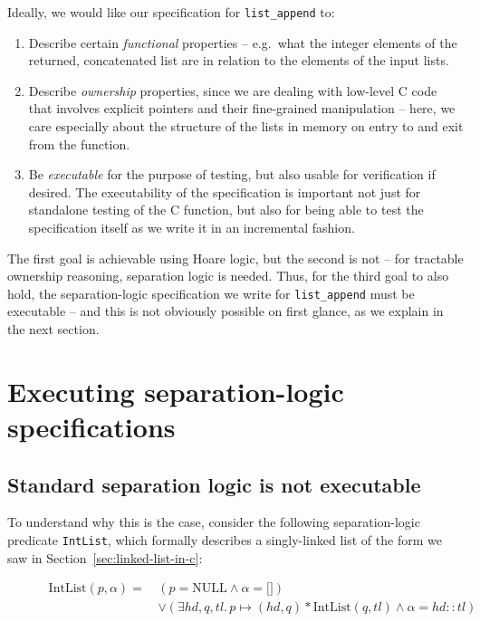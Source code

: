 Ideally, we would like our specification for \texttt{list\_append} to:

\begin{enumerate}
  \item Describe certain \emph{functional} properties -- e.g.~what the integer elements of the returned, concatenated list are in relation to the elements of the input lists.
  \item Describe \emph{ownership} properties, since we are dealing with low-level C code that involves explicit pointers and their fine-grained manipulation -- here, we care especially about the structure of the lists in memory on entry to and exit from the function.
  \item Be \emph{executable} for the purpose of testing, but also usable for verification if desired. The executability of the specification is important not just for standalone testing of the C function, but also for being able to test the specification itself as we write it in an incremental fashion.
\end{enumerate}

The first goal is achievable using Hoare logic, but the second is not -- for tractable ownership reasoning, separation logic is needed. Thus, for the third goal to also hold, the separation-logic specification we write for \texttt{list\_append} must be executable -- and this is not obviously possible on first glance, as we explain in the next section. 

\section{Executing separation-logic specifications}

\subsection{Standard separation logic is not executable}

To understand why this is the case, consider the following separation-logic predicate \texttt{IntList}, which formally describes a singly-linked list of the form we saw in Section~\ref{sec:linked-list-in-c}:

\begin{figure}[h]
  \vspace{-0.8em}
  \begin{align*}
  \text{IntList}(p, \alpha) =\, &(p = \text{NULL} \land \alpha = \lbrack\rbrack)\\
  &\lor (\exists{hd}, q, {tl}.\,p \mapsto ({hd}, q) \ast \text{IntList}(q, {tl}) \land \alpha = {hd} :: {tl})
  \end{align*}
  \vspace{-2em}
\end{figure}

